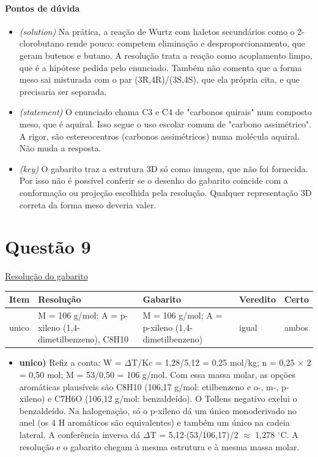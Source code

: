 \documentclass{article}%
\begin{document}
\paragraph{Pontos de dúvida}%
\begin{itemize}%
\item%
\textit{(solution)} Na prática, a reação de Wurtz com haletos secundários como o 2{-}clorobutano rende pouco: competem eliminação e desproporcionamento, que geram butenos e butano. A resolução trata a reação como acoplamento limpo, que é a hipótese pedida pelo enunciado. Também não comenta que a forma meso sai misturada com o par (3R,4R)/(3S,4S), que ela própria cita, e que precisaria ser separada.%
\item%
\textit{(statement)} O enunciado chama C3 e C4 de "carbonos quirais" num composto meso, que é aquiral. Isso segue o uso escolar comum de "carbono assimétrico". A rigor, são estereocentros (carbonos assimétricos) numa molécula aquiral. Não muda a resposta.%
\item%
\textit{(key)} O gabarito traz a estrutura 3D só como imagem, que não foi fornecida. Por isso não é possível conferir se o desenho do gabarito coincide com a conformação ou projeção escolhida pela resolução. Qualquer representação 3D correta da forma meso deveria valer.%
\end{itemize}%
\section*{Questão 9}%
\href{https://poliedroresolve.sistemapoliedro.com.br/vestibulares/ime/2027/ime-2-fase-dia-3-28-10-2026-2-fase-dia-3/dissertativa-9-quimica-2-fase-dia-3-ime-2027}{Resolução do gabarito}\par\smallskip%
\begin{longtable}{@{}p{} p{} p{} p{} p{}@{}}\toprule Item & Resolução & Gabarito & Veredito & Certo \\ \midrule
unico & M = 106 g/mol; A = p{-}xileno (1,4{-}dimetilbenzeno), C8H10 & M = 106 g/mol; A = p{-}xileno (1,4{-}dimetilbenzeno) & igual & ambos \\
\bottomrule\end{longtable}%
\begin{itemize}%
\item%
\textbf{unico)} Refiz a conta: W = $\Delta$T/Kc = 1,28/5,12 = 0,25 mol/kg; n = 0,25 $\times$ 2 = 0,50 mol; M = 53/0,50 = 106 g/mol. Com essa massa molar, as opções aromáticas plausíveis são C8H10 (106,17 g/mol: etilbenzeno e o{-}, m{-}, p{-}xileno) e C7H6O (106,12 g/mol: benzaldeído). O Tollens negativo exclui o benzaldeído. Na halogenação, só o p{-}xileno dá um único monoderivado no anel (os 4 H aromáticos são equivalentes) e também um único na cadeia lateral. A conferência inversa dá $\Delta$T = 5,12$\cdot$(53/106,17)/2 $\approx$ 1,278 $^\circ$C. A resolução e o gabarito chegam à mesma estrutura e à mesma massa molar.%
\end{itemize}%
\end{document}
